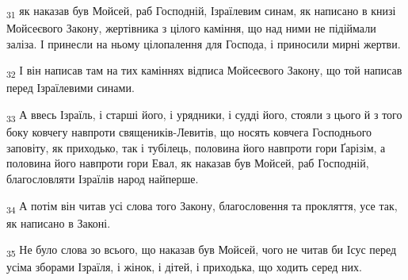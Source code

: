 \begin{tcolorbox}
\textsubscript{31} як наказав був Мойсей, раб Господній, Ізраїлевим синам, як написано в книзі Мойсеєвого Закону, жертівника з цілого каміння, що над ними не підіймали заліза. І принесли на ньому цілопалення для Господа, і приносили мирні жертви.
\end{tcolorbox}
\begin{tcolorbox}
\textsubscript{32} І він написав там на тих каміннях відписа Мойсеєвого Закону, що той написав перед Ізраїлевими синами.
\end{tcolorbox}
\begin{tcolorbox}
\textsubscript{33} А ввесь Ізраїль, і старші його, і урядники, і судді його, стояли з цього й з того боку ковчегу навпроти священиків-Левитів, що носять ковчега Господнього заповіту, як приходько, так і тубілець, половина його навпроти гори Ґарізім, а половина його навпроти гори Евал, як наказав був Мойсей, раб Господній, благословляти Ізраїлів народ найперше.
\end{tcolorbox}
\begin{tcolorbox}
\textsubscript{34} А потім він читав усі слова того Закону, благословення та прокляття, усе так, як написано в Законі.
\end{tcolorbox}
\begin{tcolorbox}
\textsubscript{35} Не було слова зо всього, що наказав був Мойсей, чого не читав би Ісус перед усіма зборами Ізраїля, і жінок, і дітей, і приходька, що ходить серед них.
\end{tcolorbox}
